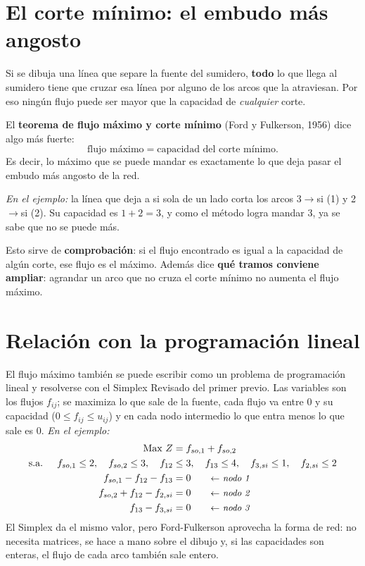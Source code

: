 \documentclass[11pt,a4paper]{article}
\begin{document}
\section{El corte mínimo: el embudo más angosto}

Si se dibuja una línea que separe la fuente del sumidero, \textbf{todo} lo que llega al sumidero tiene que cruzar
esa línea por alguno de los arcos que la atraviesan. Por eso ningún flujo puede ser mayor que la capacidad de
\emph{cualquier} corte.

El \textbf{teorema de flujo máximo y corte mínimo} (Ford y Fulkerson, 1956) dice algo más fuerte:
\[
\text{flujo máximo} = \text{capacidad del corte mínimo}.
\]
Es decir, lo máximo que se puede mandar es exactamente lo que deja pasar el embudo más angosto de la red.

\textit{En el ejemplo:} la línea que deja a si sola de un lado corta los arcos 3$\to$si (1) y 2$\to$si (2).
Su capacidad es $1 + 2 = 3$, y como el método logra mandar 3, ya se sabe que no se puede más.

Esto sirve de \textbf{comprobación}: si el flujo encontrado es igual a la capacidad de algún corte, ese flujo es
el máximo. Además dice \textbf{qué tramos conviene ampliar}: agrandar un arco que no cruza el corte mínimo no
aumenta el flujo máximo.

\section{Relación con la programación lineal}

El flujo máximo también se puede escribir como un problema de programación lineal y resolverse con el Simplex
Revisado del primer previo. Las variables son los flujos $f_{ij}$; se maximiza lo que sale de la fuente, cada
flujo va entre 0 y su capacidad ($0 \le f_{ij} \le u_{ij}$) y en cada nodo intermedio lo que entra menos lo que
sale es 0. \textit{En el ejemplo:}
\[
\begin{aligned}
\text{Max } Z &= f_{so,1} + f_{so,2}\\
\text{s.a. } \quad f_{so,1} \le 2,\quad f_{so,2} \le 3,\quad f_{12} &\le 3,\quad f_{13} \le 4,\quad f_{3,si} \le 1,\quad f_{2,si} \le 2\\
f_{so,1} - f_{12} - f_{13} &= 0 \nota{nodo 1}\\
f_{so,2} + f_{12} - f_{2,si} &= 0 \nota{nodo 2}\\
f_{13} - f_{3,si} &= 0 \nota{nodo 3}
\end{aligned}
\]
El Simplex da el mismo valor, pero Ford-Fulkerson aprovecha la forma de red: no necesita matrices, se hace a mano
sobre el dibujo y, si las capacidades son enteras, el flujo de cada arco también sale entero.
\end{document}
